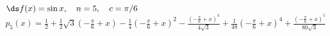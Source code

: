 {$\ds f(x) = \sin x, \quad n=5, \quad c=\pi/6$
}
{$p_5(x) = \frac{1}{2}+\frac{1}{2} \sqrt{3} \left(-\frac{\pi
   }{6}+x\right)-\frac{1}{4} \left(-\frac{\pi
   }{6}+x\right)^2-\frac{\left(-\frac{\pi }{6}+x\right)^3}{4
   \sqrt{3}}+\frac{1}{48} \left(-\frac{\pi
   }{6}+x\right)^4+\frac{\left(-\frac{\pi
   }{6}+x\right)^5}{80 \sqrt{3}}$
}
